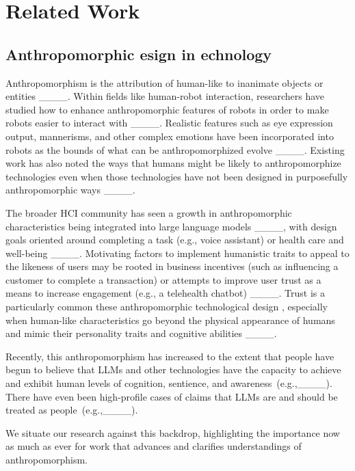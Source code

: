 \section{Related Work}
\subsection{Anthropomorphic esign in echnology}
Anthropomorphism is the attribution of human-like  to inanimate objects or entities ____. Within fields like human-robot interaction, researchers have studied how to enhance anthropomorphic features of robots in order to make robots easier to interact with ____. Realistic features such as eye expression output, mannerisms, and other complex emotions have been incorporated into robots as the bounds of what can be anthropomorphized evolve ____. Existing work has also noted the ways that humans might be likely to anthropomorphize technologies even when those technologies have not been designed in purposefully anthropomorphic ways ____.

The broader HCI community has seen a growth in anthropomorphic characteristics being integrated into large language models ____, with design goals oriented around completing a task (e.g., voice assistant) or health care and well-being ____. Motivating factors to implement humanistic traits to appeal to the likeness of users may be rooted in business incentives (such as influencing a customer to complete a transaction) or attempts to improve user trust as a means to increase engagement (e.g., a telehealth chatbot) ____. Trust is a particularly common  these anthropomorphic technological design , especially when human-like characteristics go beyond the physical appearance of humans and mimic their personality traits and cognitive abilities ____. 

Recently, this anthropomorphism has increased to the extent that people have begun to believe that LLMs and other technologies have the capacity to achieve and exhibit human levels of cognition, sentience, and awareness~(e.g.,____). There have even been high-profile cases of claims that LLMs are and should be treated as people~(e.g.,____). 

We situate our research against this backdrop, highlighting the importance now as much as ever for work that advances and clarifies understandings of anthropomorphism. 


